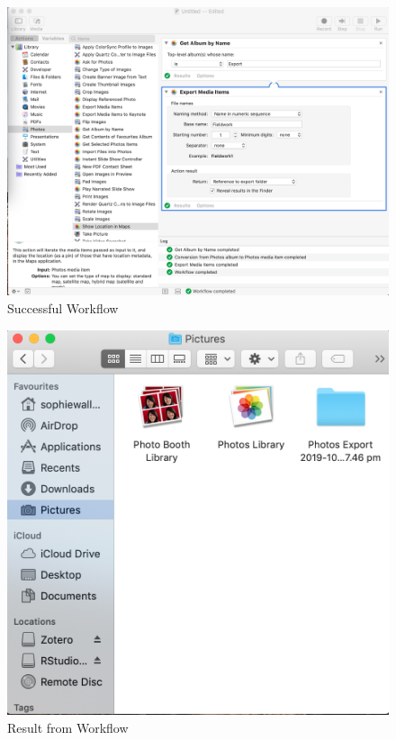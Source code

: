 \documentclass{article}
\begin{document}
\begin{figure}[H]
    \centering
    \includegraphics[width=\textwidth]{Images/Workflow_Success1.png}
    \caption{Successful Workflow}
    \label{fig:my_label}
\end{figure}

\begin{figure}[H]
    \centering
    \includegraphics[width=\textwidth]{Images/PhotoExport_1.png}
    \caption{Result from Workflow}
    \label{fig:my_label}
\end{figure}
\end{document}

